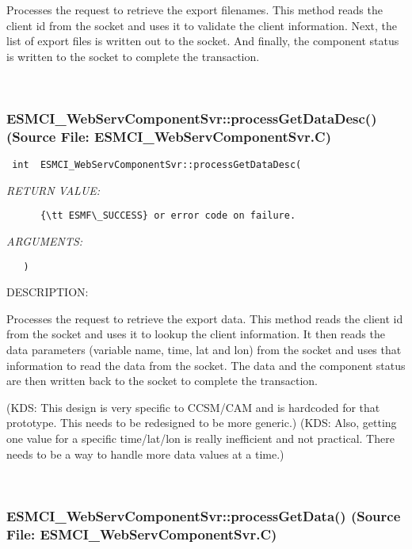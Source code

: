       Processes the request to retrieve the export filenames.  This method
      reads the client id from the socket and uses it to validate the client
      information. Next, the list of export files is written out to the
      socket.  And finally, the component status is written to the socket
      to complete the transaction.
   
 
\mbox{}\hrulefill\
 
\subsubsection{ESMCI\_WebServComponentSvr::processGetDataDesc() (Source File: ESMCI\_WebServComponentSvr.C)}


  
\begin{verbatim} int  ESMCI_WebServComponentSvr::processGetDataDesc(\end{verbatim}{\em RETURN VALUE:}
\begin{verbatim}      {\tt ESMF\_SUCCESS} or error code on failure.\end{verbatim}{\em ARGUMENTS:}
\begin{verbatim}   )\end{verbatim}
{\sf DESCRIPTION:\\ }


      Processes the request to retrieve the export data.  This method
      reads the client id from the socket and uses it to lookup the client
      information.  It then reads the data parameters (variable name, time,
      lat and lon) from the socket and uses that information to read the
      data from the socket.  The data and the component status are then
      written back to the socket to complete the transaction.
  
      (KDS: This design is very specific to CCSM/CAM and is hardcoded for
            that prototype.  This needs to be redesigned to be more generic.)
      (KDS: Also, getting one value for a specific time/lat/lon is really
            inefficient and not practical.  There needs to be a way to handle
            more data values at a time.)
   
 
\mbox{}\hrulefill\
 
\subsubsection{ESMCI\_WebServComponentSvr::processGetData() (Source File: ESMCI\_WebServComponentSvr.C)}


